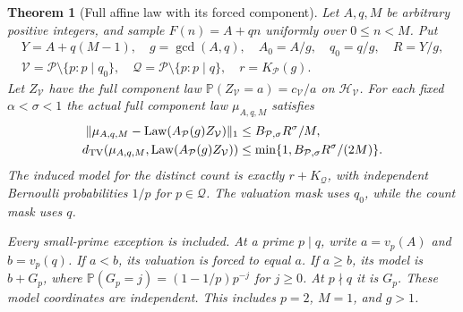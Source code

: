 \documentclass[11pt]{article}
\newtheorem{theorem}{Theorem}[section]
\theoremstyle{definition}
\begin{document}
\begin{theorem}[Full affine law with its forced component]
\label{thm:affine-thin-full-law}
Let $A,q,M$ be arbitrary positive integers, and sample
$F(n)=A+qn$ uniformly over $0\le n<M$.  Put
\begin{equation}
 \begin{gathered}
 Y=A+q(M-1),\quad g=\gcd(A,q),\quad
 A_0=A/g,\quad q_0=q/g,\quad R=Y/g,\\
 \mathcal V=\mathcal P\setminus\{p:p\mid q_0\},\quad
 \mathcal Q=\mathcal P\setminus\{p:p\mid q\},\quad
 r=K_{\mathcal P}(g).
 \end{gathered}
 \label{eq:affine-thin-domains}
\end{equation}
Let $Z_{\mathcal V}$ have the full component law
$\mathbb P(Z_{\mathcal V}=a)=c_{\mathcal V}/a$ on
$\mathcal H_{\mathcal V}$.
For each fixed $\alpha<\sigma<1$ the actual full component law
$\mu_{A,q,M}$ satisfies
\begin{equation}
 \begin{aligned}
 \|\mu_{A,q,M}
       -\operatorname{Law}(A_{\mathcal P}(g)Z_{\mathcal V})\|_1
   &\le B_{\mathcal P,\sigma}R^\sigma/M,\\
 d_{\rm TV}(\mu_{A,q,M},
       \operatorname{Law}(A_{\mathcal P}(g)Z_{\mathcal V}))
   &\le\min\{1,B_{\mathcal P,\sigma}R^\sigma/(2M)\}.
 \end{aligned}
 \label{eq:affine-thin-full-budget}
\end{equation}
The induced model for the distinct count is exactly
$r+K_{\mathcal Q}$, with independent Bernoulli probabilities
$1/p$ for $p\in\mathcal Q$.
The valuation mask uses $q_0$, while the count mask uses $q$.

Every small-prime exception is included.  At a prime $p\mid q$,
write $a=v_p(A)$ and $b=v_p(q)$.
If $a<b$, its valuation is forced to equal $a$.
If $a\ge b$, its model is $b+G_p$, where
$\mathbb P(G_p=j)=(1-1/p)p^{-j}$ for $j\ge0$.
At $p\nmid q$ it is $G_p$.  These model coordinates are independent.
This includes $p=2$, $M=1$, and $g>1$.
\end{theorem}
\end{document}
